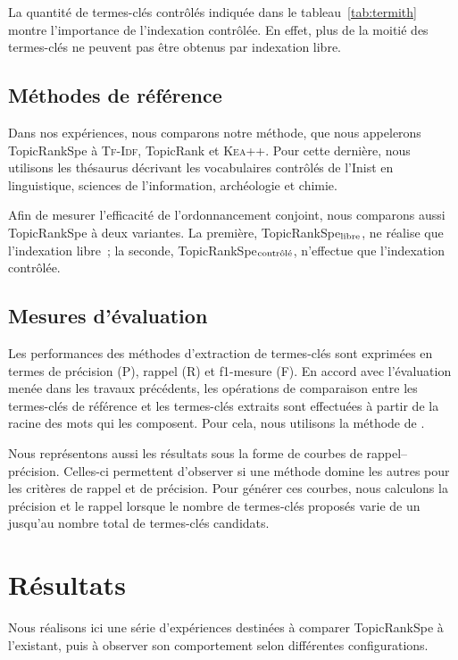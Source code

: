     La quantité de termes-clés contrôlés indiquée dans le
    tableau~\ref{tab:termith} montre l'importance de l'indexation contrôlée. En
    effet, plus de la moitié des termes-clés ne peuvent pas être obtenus par
    indexation libre.

  \subsection{Méthodes de référence}
  \label{subsec:main-domain_specific_keyphrase_annotation-supervised_automatic_keyphrase_annotation-evaluation-baselines}
    Dans nos expériences, nous comparons notre méthode, que nous appelerons
    TopicRankSpe à \textsc{Tf-Idf}, TopicRank et \textsc{Kea++}. Pour cette
    dernière, nous utilisons les thésaurus décrivant les vocabulaires contrôlés
    de l'Inist en linguistique, sciences de l'information, archéologie et chimie.

    Afin de mesurer l'efficacité de l'ordonnancement conjoint, nous comparons
    aussi TopicRankSpe à deux variantes. La première,
    TopicRankSpe$_\textnormal{libre}$, ne réalise que l'indexation
    libre~; la seconde, TopicRankSpe$_\textnormal{contrôlé}$, n'effectue
    que l'indexation contrôlée.
  
  \subsection{Mesures d'évaluation}
  \label{subsec:main-domain_specific_keyphrase_annotation-supervised_automatic_keyphrase_annotation-evaluation-evaluation_measures}
    Les performances des méthodes d'extraction de termes-clés sont exprimées
    en termes de précision (P), rappel (R) et f1-mesure (F). En
    accord avec l'évaluation menée dans les travaux précédents, les
    opérations de comparaison entre les termes-clés de référence et les
    termes-clés extraits sont effectuées à partir de la racine des mots qui
    les composent. Pour cela, nous utilisons la méthode de
    .

    Nous représentons aussi les résultats sous la forme de courbes de
    rappel--précision. Celles-ci permettent d'observer si une méthode domine
    les autres pour les critères de rappel et de précision.
    Pour générer ces courbes, nous calculons la précision et
    le rappel lorsque  le nombre de termes-clés proposés varie de
    un jusqu'au nombre total de termes-clés candidats.
  
\section{Résultats}
\label{sec:main-domain_specific_keyphrase_annotation-supervised_automatic_keyphrase_annotation-evaluation-topiccorank_specific_domains}
  Nous réalisons ici une série d'expériences destinées à comparer
  TopicRankSpe à l'existant, puis à observer son comportement selon
  différentes configurations.

